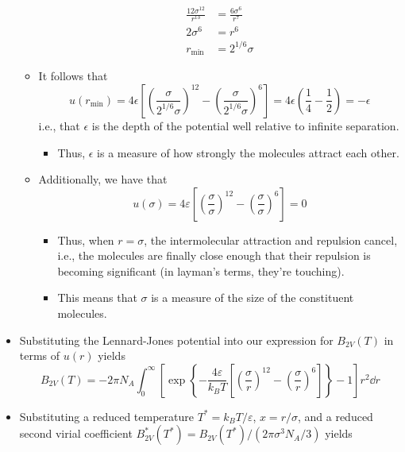\documentclass[../notes.tex]{subfiles}
\begin{document}
\begin{itemize}
\begin{itemize}
\begin{align*}
            \frac{12\sigma^{12}}{r^{13}} &= \frac{6\sigma^6}{r^7}\\
            2\sigma^6 &= r^6\\
            r_\text{min} &= 2^{1/6}\sigma
        \end{align*}
        \item It follows that
        \begin{equation*}
            u(r_\text{min}) = 4\epsilon\left[ \left( \frac{\sigma}{2^{1/6}\sigma} \right)^{12}-\left( \frac{\sigma}{2^{1/6}\sigma} \right)^6 \right]
            = 4\epsilon\left( \frac{1}{4}-\frac{1}{2} \right)
            = -\epsilon
        \end{equation*}
        i.e., that $\epsilon$ is the depth of the potential well relative to infinite separation.
        \begin{itemize}
            \item Thus, $\epsilon$ is a measure of how strongly the molecules attract each other.
        \end{itemize}
        \item Additionally, we have that
        \begin{equation*}
            u(\sigma) = 4\varepsilon\left[ \left( \frac{\sigma}{\sigma} \right)^{12}-\left( \frac{\sigma}{\sigma} \right)^6 \right] = 0
        \end{equation*}
        \begin{itemize}
            \item Thus, when $r=\sigma$, the intermolecular attraction and repulsion cancel, i.e., the molecules are finally close enough that their repulsion is becoming significant (in layman's terms, they're touching).
            \item This means that $\sigma$ is a measure of the size of the constituent molecules.
        \end{itemize}
    \end{itemize}
    \item Substituting the Lennard-Jones potential into our expression for $B_{2V}(T)$ in terms of $u(r)$ yields
    \begin{equation*}
        B_{2V}(T) = -2\pi N_A\int_0^\infty\left[ \exp\left\{ -\frac{4\varepsilon}{k_BT}\left[ \left( \frac{\sigma}{r} \right)^{12}-\left( \frac{\sigma}{r} \right)^6 \right] \right\}-1 \right]r^2\dd{r}
    \end{equation*}
    \item Substituting a reduced temperature $T^*=k_BT/\varepsilon$, $x=r/\sigma$, and a reduced second virial coefficient $B_{2V}^*(T^*)=B_{2V}(T^*)/(2\pi\sigma^3N_A/3)$ yields

\end{itemize}
\end{document}
